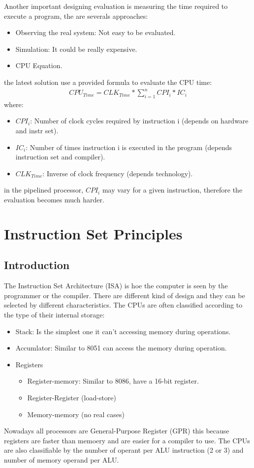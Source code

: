 \documentclass[12pt]{article}
\begin{document}
Another important designing evaluation is measuring the time required to execute a program, the are severals approaches:
\begin{itemize}
  \item Observing the real system: Not easy to be evaluated.
  \item Simulation: It could be really expensive.
  \item CPU Equation.
\end{itemize}
the latest solution use a provided formula to evaluate the CPU time:
\begin{equation}
  \begin{gathered}
    CPU_{Time} = CLK_{Time}*\sum_{i=1}^n{CPI_{i}*IC_{i}}
    \label{eq:tsoglie}
  \end{gathered}
\end{equation}
where:
\begin{itemize}
  \item \textbf{$CPI_{i}$}: Number of clock cycles required by instruction i (depends on hardware and instr set).
  \item \textbf{$IC_{i}$}: Number of times instruction i is executed in the program (depends instruction set and compiler).
  \item \textbf{$CLK_{Time}$}: Inverse of clock frequency (depends technology).
\end{itemize}
in the pipelined processor, $CPI_{i}$ may vary for a given instruction, therefore the evaluation becomes much harder.

\section{Instruction Set Principles}
\subsection{Introduction}
The Instruction Set Architecture (ISA) is hoe the computer is seen by the programmer or the compiler. There are different kind of design and they can be selected by different characteristics. The CPUs are often classified according to the type of their internal storage:
\begin{itemize}
  \item Stack: Is the simplest one it can't accessing memory during operations.
  \item Accumlator: Similar to 8051 can access the memory during operation.
  \item Registers
  \begin{itemize}
    \item Register-memory: Similar to 8086, have a 16-bit register.
    \item Register-Register (load-store)
    \item Memory-memory (no real cases)
  \end{itemize}
\end{itemize}
Nowadays all processors are General-Purpose Register (GPR) this because registers are faster than memoery and are easier for a compiler to use. The CPUs are also classifiable by the number of operant per ALU instruction (2 or 3) and number of memory operand per ALU.\\
\end{document}
